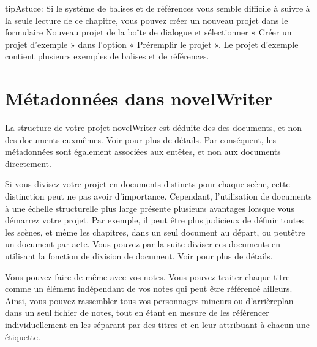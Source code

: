 \documentclass[a4paper,11pt,french]{sphinxmanual}
\begin{document}
\begin{sphinxadmonition}{tip}{Astuce:}
\sphinxAtStartPar
Si le système de balises et de références vous semble difficile à suivre à la seule lecture de ce chapitre, vous pouvez créer un nouveau projet dans le formulaire Nouveau projet de la boîte de dialogue  et sélectionner « Créer un projet d’exemple » dans l’option « Pré\sphinxhyphen{}remplir le projet ». Le projet d’exemple contient plusieurs exemples de balises et de références.
\end{sphinxadmonition}


\section{Métadonnées dans novelWriter}
\label{\detokenize{project_references:metadata-in-novelwriter}}\label{\detokenize{project_references:a-references-metadata}}
\sphinxAtStartPar
La structure de votre projet novelWriter est déduite des  des documents, et non des documents eux\sphinxhyphen{}mêmes. Voir {\hyperref[\detokenize{project_structure:a-struct-heads}]{}} pour plus de détails. Par conséquent, les métadonnées sont également associées aux en\sphinxhyphen{}têtes, et non aux documents directement.

\sphinxAtStartPar
Si vous divisez votre projet en documents distincts pour chaque scène, cette distinction peut ne pas avoir d’importance. Cependant, l’utilisation de documents à une échelle structurelle plus large présente plusieurs avantages lorsque vous démarrez votre projet. Par exemple, il peut être plus judicieux de définir toutes les scènes, et même les chapitres, dans un seul document au départ, ou peut\sphinxhyphen{}être un document par acte. Vous pouvez par la suite diviser ces documents en utilisant la fonction de division de document. Voir {\hyperref[\detokenize{usage_project:a-ui-tree-split-merge}]{}} pour plus de détails.

\sphinxAtStartPar
Vous pouvez faire de même avec vos notes. Vous pouvez traiter chaque titre comme un élément indépendant de vos notes qui peut être référencé ailleurs. Ainsi, vous pouvez rassembler tous vos personnages mineurs ou d’arrière\sphinxhyphen{}plan dans un seul fichier de notes, tout en étant en mesure de les référencer individuellement en les séparant par des titres et en leur attribuant à chacun une étiquette.
\end{document}
